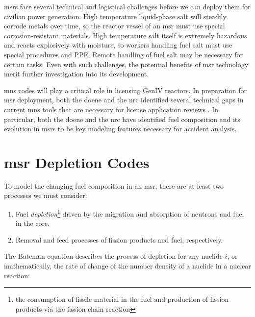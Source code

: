 \Gls{msr}s face several technical and logistical challenges before we can
deploy them for civilian power generation. High temperature liquid-phase salt
will steadily corrode metals over time, so the reactor vessel of an \Gls{msr}
must use special corrosion-resistant materials. High temperature salt itself is
extremely hazardous and reacts explosively with moisture, so workers handling
fuel salt must use special procedures and PPE. Remote handling of fuel salt may
be necessary for certain tasks. Even with such challenges, the 
potential benefits of \Gls{msr} technology merit further investigation
into its development.

\Gls{mns} codes will play a critical role in licensing GenIV reactors. In
preparation for \Gls{msr} deployment, both the \Gls{doene} and the \Gls{nrc}
identified several technical gaps in current \Gls{mns} tools that are necessary
for license application reviews
\cite{betzler_modeling_2019} \cite{usnrc_nonlwr_2020-1}. In particular, both the
\Gls{doene} and the \Gls{nrc} have identified fuel composition and its
evolution in \Gls{msr}s to be key modeling features necessary for accident
analysis. 

\section{\Gls{msr} Depletion Codes}%
\label{sec:msr_codes}

To model the changing fuel composition in an \Gls{msr}, there are at least two
processes we must consider:
\begin{enumerate}
    \item Fuel {\it depletion}\footnote{the consumption of fissile material in the fuel and production of fission products via the fission chain reaction} driven by the migration and absorption of neutrons and fuel in the core.
    \item Removal and feed processes of fission products and fuel, respectively.
\end{enumerate}

The Bateman equation describes the process of depletion for any nuclide $i$, or
mathematically, the rate of change of the number density of a nuclide in a nuclear reaction:

